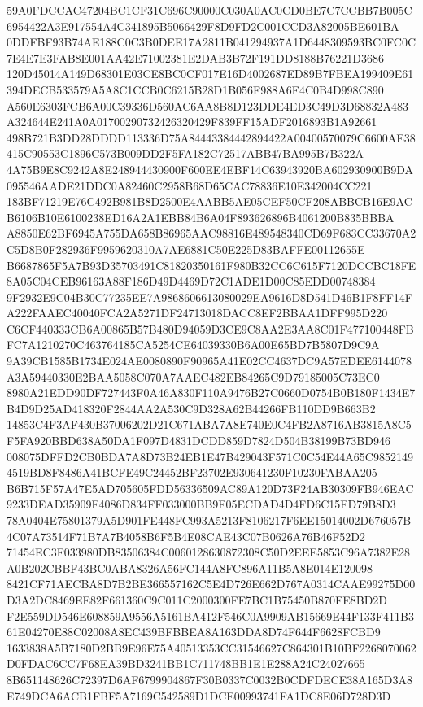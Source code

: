 \documentclass[UTF8,fontset=fandol,zihao=-4,a4paper]{ctexart}
\begin{document}
{{59A0FDCCAC47204BC1CF31C696C90000C030A0AC0CD0BE7C7CCBB7B005C6954422A3E917554A4C341895B5066429F8D9FD2C001CCD3A82005BE601BA
0DDFBF93B74AE188C0C3B0DEE17A2811B041294937A1D6448309593BC0FC0C7E4E7E3FAB8E001AA42E71002381E2DAB3B72F191DD8188B76221D3686
120D45014A149D68301E03CE8BC0CF017E16D4002687ED89B7FBEA199409E61394DECB533579A5A8C1CCB0C6215B28D1B056F988A6F4C0B4D998C890
A560E6303FCB6A00C39336D560AC6AA8B8D123DDE4ED3C49D3D68832A483A324644E241A0A01700290732426320429F839FF15ADF2016893B1A92661
498B721B3DD28DDDD113336D75A84443384442894422A00400570079C6600AE38415C90553C1896C573B009DD2F5FA182C72517ABB47BA995B7B322A
4A75B9E8C9242A8E248944430900F600EE4EBF14C63943920BA602930900B9DA095546AADE21DDC0A82460C2958B68D65CAC78836E10E342004CC221
183BF71219E76C492B981B8D2500E4AABB5AE05CEF50CF208ABBCB16E9ACB6106B10E6100238ED16A2A1EBB84B6A04F893626896B4061200B835BBBA
A8850E62BF6945A755DA658B86965AAC98816E489548340CD69F683CC33670A2C5D8B0F282936F9959620310A7AE6881C50E225D83BAFFE00112655E
B6687865F5A7B93D35703491C81820350161F980B32CC6C615F7120DCCBC18FE8A05C04CEB96163A88F186D49D4469D72C1ADE1D00C85EDD00748384
9F2932E9C04B30C77235EE7A9868606613080029EA9616D8D541D46B1F8FF14FA222FAAEC40040FCA2A5271DF24713018DACC8EF2BBAA1DFF995D220
C6CF440333CB6A00865B57B480D94059D3CE9C8AA2E3AA8C01F477100448FBFC7A1210270C463764185CA5254CE64039330B6A00E65BD7B5807D9C9A
9A39CB1585B1734E024AE0080890F90965A41E02CC4637DC9A57EDEE6144078A3A59440330E2BAA5058C070A7AAEC482EB84265C9D79185005C73EC0
8980A21EDD90DF727443F0A46A830F110A9476B27C0660D0754B0B180F1434E7B4D9D25AD418320F2844AA2A530C9D328A62B44266FB110DD9B663B2
14853C4F3AF430B37006202D21C671ABA7A8E740E0C4FB2A8716AB3815A8C5F5FA920BBD638A50DA1F097D4831DCDD859D7824D504B38199B73BD946
008075DFFD2CB0BDA7A8D73B24EB1E47B429043F571C0C54E44A65C98521494519BD8F8486A41BCFE49C24452BF23702E930641230F10230FABAA205
B6B715F57A47E5AD705605FDD56336509AC89A120D73F24AB30309FB946EAC9233DEAD35909F4086D834FF033000BB9F05ECDAD4D4FD6C15FD79B8D3
78A0404E75801379A5D901FE448FC993A5213F8106217F6EE15014002D676057B4C07A73514F71B7A7B4058B6F5B4E08CAE43C07B0626A76B46F52D2
71454EC3F033980DB83506384C0060128630872308C50D2EEE5853C96A7382E28A0B202CBBF43BC0ABA8326A56FC144A8FC896A11B5A8E014E120098
8421CF71AECBA8D7B2BE366557162C5E4D726E662D767A0314CAAE99275D00D3A2DC8469EE82F661360C9C011C2000300FE7BC1B75450B870FE8BD2D
F2E559DD546E608859A9556A5161BA412F546C0A9909AB15669E44F133F411B361E04270E88C02008A8EC439BFBBEA8A163DDA8D74F644F6628FCBD9
1633838A5B7180D2BB9E96E75A40513353CC31546627C864301B10BF2268070062D0FDAC6CC7F68EA39BD3241BB1C711748BB1E1E288A24C24027665
8B651148626C72397D6AF6799904867F30B0337C0032B0CDFDECE38A165D3A8E749DCA6ACB1FBF5A7169C542589D1DCE00993741FA1DC8E06D728D3D
}}
\end{document}

